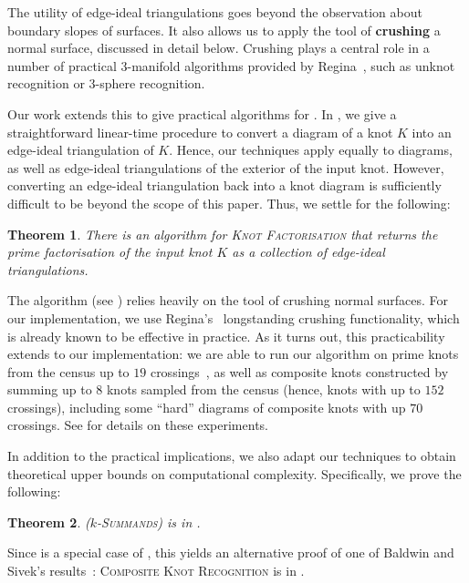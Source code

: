 \documentclass[10pt,a4paper]{amsart}
\newtheorem{theorem}{Theorem}
\begin{document}
The utility of edge-ideal triangulations goes beyond the observation about boundary slopes of surfaces.
It also allows us to apply the tool of \textbf{crushing} a normal surface, discussed in detail below. Crushing plays a central role in a number of practical $3$-manifold algorithms provided by Regina~\cite{burton2013regina,burton2014crushing,Regina}, such as unknot recognition or $3$-sphere recognition.

Our work extends this to give practical algorithms for .
In , we give a straightforward linear-time procedure to convert
a diagram of a knot $K$ into an edge-ideal triangulation of $K$. Hence, our techniques
apply equally to diagrams, as well as edge-ideal triangulations of the exterior of the
input knot. However, converting an edge-ideal triangulation back into a knot diagram is
sufficiently difficult to be beyond the scope of this paper. Thus, we settle for the following:

\begin{theorem}\label{thm:summandsAlgo}
There is an algorithm  for \textup{\textsc{Knot Factorisation}} that
returns the prime factorisation of the input knot $K$ as a collection of edge-ideal triangulations.
\end{theorem}

The algorithm (see ) relies heavily on the tool of crushing normal surfaces.
For our implementation, we use Regina's~\cite{Regina} longstanding crushing functionality, which is already known to be effective in practice.
As it turns out, this practicability extends to our implementation: we are able to run our algorithm on prime knots from the census up to $19$ crossings~\cite{burton2020knots},
as well as composite knots constructed by summing up to $8$ knots sampled from the census (hence, knots with up to $152$ crossings), including some ``hard'' diagrams of composite knots with up $70$ crossings.
See  for details on these experiments.

In addition to the practical implications, we also adapt our techniques to obtain theoretical upper bounds on computational complexity. Specifically, we prove the following:

\begin{theorem}\label{thm:summandsNP}
 ($k$\textup{-\textsc{Summands}}) is in \NP.
\end{theorem}

Since  is a special case of , this yields an alternative proof of one of Baldwin and Sivek's results~\cite[Theorem~7.3]{baldwin2019complexity}:
\textsc{Composite Knot Recognition} is in \NP.
\end{document}
